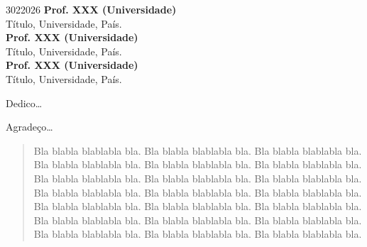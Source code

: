 \documentclass[diss,capa,times,english]{ppgci}
\author{Wojciechowski}{Anderson Martins}
\begin{document}

\maketitle 

\sloppy

\fichacatalografica

\begin{aprovacao}{30}{2}{2026}
\noindent \textbf {Prof. XXX (Universidade)}\\
Título, Universidade, País.\\[1cm] 

\noindent \textbf {Prof. XXX (Universidade)}\\
Título, Universidade, País.\\[1cm] 

\noindent \textbf {Prof. XXX (Universidade)}\\
Título, Universidade, País.
\end{aprovacao}

\begin{dedicatoria}
  Dedico\ldots 
\end{dedicatoria}

\begin{agradecimentos}
  Agradeço\ldots 
\end{agradecimentos}

\begin{epigrafe}
\end{epigrafe}



\ifshowabstractpt
\begin{abstract}
Bla blabla blablabla bla.  Bla blabla blablabla bla.  Bla blabla
blablabla bla.  Bla blabla blablabla bla.  Bla blabla blablabla bla.
Bla blabla blablabla bla.  Bla blabla blablabla bla.  Bla blabla
blablabla bla.  Bla blabla blablabla bla.  Bla blabla blablabla bla.
Bla blabla blablabla bla.  Bla blabla blablabla bla.  Bla blabla
blablabla bla.  Bla blabla blablabla bla.  Bla blabla blablabla bla.
Bla blabla blablabla bla.  Bla blabla blablabla bla.  Bla blabla
blablabla bla.  Bla blabla blablabla bla.  Bla blabla blablabla bla.
Bla blabla blablabla bla.
\end{abstract}
\fi
\end{document}
